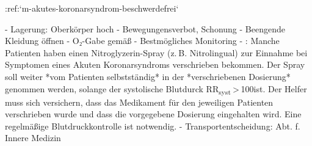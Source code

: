 
:ref:`m-akutes-koronarsyndrom-beschwerdefrei`
%
\begin{itemize}
    -   Lagerung: Oberkörper hoch
  -   Bewegungensverbot, Schonung
  -   Beengende Kleidung öffnen
    -   O₂-Gabe gemäß 
  -   Bestmögliches Monitoring
  -   : Manche Patienten haben einen
  Nitroglyzerin-Spray (z. B. Nitrolingual{\texttrademark})
  zur Einnahme bei Symptomen eines Akuten Koronarsyndroms
  verschrieben bekommen. Der Spray soll weiter *vom
  Patienten selbstständig* in der *verschriebenen
  Dosierung* genommen werden, solange der systolische
  Blutdurck RR\textsubscript{syst} {\textgreater} 100\MmHg*
  ist. Der Helfer muss sich versichern, dass das Medikament
  für den jeweiligen Patienten verschrieben wurde und dass
  die vorgegebene Dosierung eingehalten wird. Eine
  regelmäßige Blutdruckkontrolle ist notwendig.
  -   Transportentscheidung: Abt. f. Innere Medizin
\end{itemize}